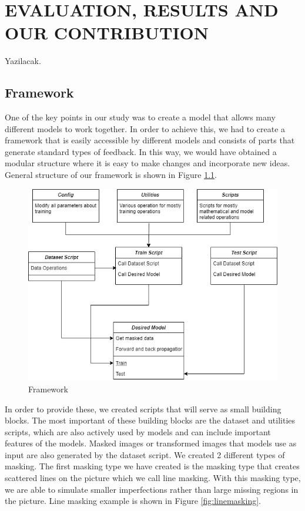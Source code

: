 \chapter{EVALUATION, RESULTS AND OUR CONTRIBUTION }\label{our_work}

Yazilacak.

\section{Framework}

One of the key points in our study was to create a model that allows many different models to work together. In order to achieve this, we had to create a framework that is easily accessible by different models and consists of parts that generate standard types of feedback. In this way, we would have obtained a modular structure where it is easy to make changes and incorporate new ideas. General structure of our framework is shown in Figure \ref{fig:framework}.

\begin{figure}[h]
    \centering
    \includegraphics[scale=0.6]{figures/chapter5/framework (1).png}
    \caption{Framework}
    \label{fig:framework}
\end{figure}
In order to provide these, we created scripts that will serve as small building blocks. The most important of these building blocks are the dataset and utilities scripts, which are also actively used by models and can include important features of the models.
\newline
Masked images or transformed images that models use as input are also generated by the dataset script. We created 2 different types of masking. The first masking type we have created is the masking type that creates scattered lines on the picture which we call line masking. With this masking type, we are able to simulate smaller imperfections rather than large missing regions in the picture. Line masking example is shown in Figure \ref{fig:linemasking}.

